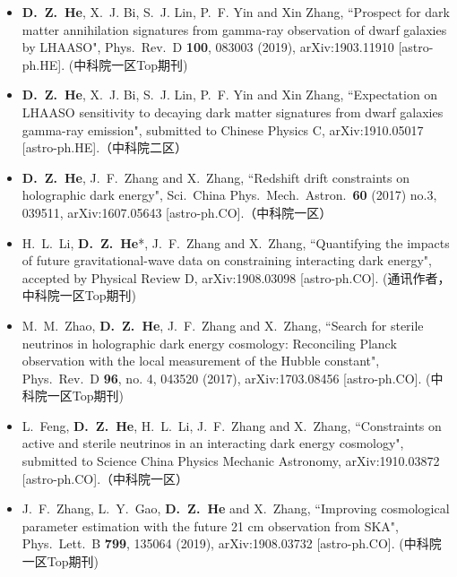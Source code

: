   \begin{itemize}[leftmargin=*]
    
    \item \textbf{D.~Z.~He}, X.~J. Bi, S.~J. Lin, P.~F. Yin and Xin Zhang, ``Prospect for dark matter annihilation signatures from gamma-ray observation of dwarf galaxies by LHAASO", Phys.\ Rev.\ D {\bf 100}, 083003 (2019), arXiv:1903.11910 [astro-ph.HE]. (中科院一区Top期刊)
    
    \item \textbf{D.~Z.~He}, X.~J. Bi, S.~J. Lin, P.~F. Yin and Xin Zhang, ``Expectation on LHAASO sensitivity to decaying dark matter signatures from dwarf galaxies gamma-ray emission", submitted to Chinese Physics C, arXiv:1910.05017 [astro-ph.HE].（中科院二区）
          
    \item \textbf{D.~Z.~He}, J.~F.~Zhang and X.~Zhang, ``Redshift drift constraints on holographic dark energy", Sci.\ China Phys.\ Mech.\ Astron.\  {\bf 60} (2017) no.3, 039511, arXiv:1607.05643 [astro-ph.CO].（中科院一区）

    \item H.~L.~Li, \textbf{D.~Z.~He}*, J.~F.~Zhang and X.~Zhang, ``Quantifying the impacts of future gravitational-wave data on constraining interacting dark energy", accepted by Physical Review D, arXiv:1908.03098 [astro-ph.CO]. (通讯作者，中科院一区Top期刊)


    \item  M.~M.~Zhao, \textbf{D.~Z.~He}, J.~F.~Zhang and X.~Zhang, ``Search for sterile neutrinos in holographic dark energy cosmology: Reconciling Planck observation with the local measurement of the Hubble constant", Phys.\ Rev.\ D {\bf 96}, no. 4, 043520 (2017), arXiv:1703.08456 [astro-ph.CO]. (中科院一区Top期刊)         

    \item L.~Feng, {\bf D.~Z.~He}, H.~L.~Li, J.~F.~Zhang and X.~Zhang, ``Constraints on active and sterile neutrinos in an interacting dark energy cosmology", submitted to Science China Physics Mechanic Astronomy, arXiv:1910.03872 [astro-ph.CO].（中科院一区）

    \item J.~F.~Zhang, L.~Y.~Gao, \textbf{D.~Z.~He} and X.~Zhang, ``Improving cosmological parameter estimation with the future 21 cm observation from SKA", Phys.\ Lett.\ B {\bf 799}, 135064 (2019), arXiv:1908.03732 [astro-ph.CO]. (中科院一区Top期刊)
     

\end{itemize}
